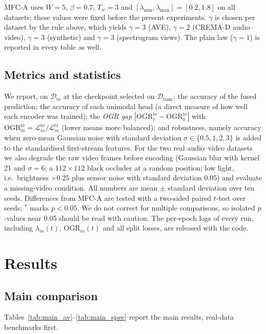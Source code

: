 \documentclass[fleqn,10pt]{wlscirep}
\newcommand{\Ltr}{\mathcal{L}^{\mathrm{tr}}}
\newcommand{\Lte}{\mathcal{L}^{\mathrm{te}}}
\newcommand{\OGR}{\mathrm{OGR}}
\begin{document}
MFC-A uses $W{=}5$, $\beta{=}0.7$, $T_w{=}3$ and $[\lambda_{\min},\lambda_{\max}]=[0.2,1.8]$ on all datasets; these values were fixed before the present experiments. $\gamma$ is chosen per dataset by the rule above, which yields $\gamma{=}3$ (AVE), $\gamma{=}2$ (CREMA-D audio--video), $\gamma{=}3$ (synthetic) and $\gamma{=}3$ (spectrogram views). The plain law ($\gamma{=}1$) is reported in every table as well.

\subsection*{Metrics and statistics}
We report, on $\mathcal{D}_{\mathrm{te}}$ at the checkpoint selected on $\mathcal{D}_{\mathrm{tune}}$: the accuracy of the fused prediction; the accuracy of each unimodal head (a direct measure of how well each encoder was trained); the \emph{OGR gap} $|\OGR^{\mathrm{te}}_v-\OGR^{\mathrm{te}}_a|$ with $\OGR^{\mathrm{te}}_m=\Lte_m/\Ltr_m$ (lower means more balanced); and robustness, namely accuracy when zero-mean Gaussian noise with standard deviation $\sigma\in\{0.5,1,2,3\}$ is added to the standardised first-stream features. For the two real audio--video datasets we also degrade the raw video frames before encoding (Gaussian blur with kernel 21 and $\sigma{=}6$; a $112{\times}112$ black occluder at a random position; low light, i.e.\ brightness $\times0.25$ plus sensor noise with standard deviation $0.05$) and evaluate a missing-video condition. All numbers are mean $\pm$ standard deviation over ten seeds. Differences from MFC-A are tested with a two-sided paired $t$-test over seeds\cite{bouthillier2021accounting}; $^{*}$ marks $p<0.05$. We do not correct for multiple comparisons, so isolated $p$-values near 0.05 should be read with caution. The per-epoch logs of every run, including $\lambda_m(t)$, $\OGR_m(t)$ and all split losses, are released with the code.

\section*{Results}
\subsection*{Main comparison}
Tables~\ref{tab:main_av}--\ref{tab:main_spec} report the main results, real-data benchmarks first.
\end{document}
